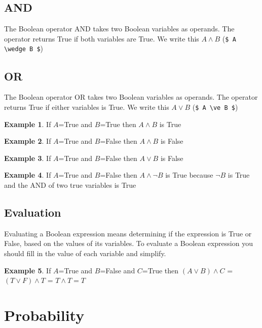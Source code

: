 \documentclass[]{article}
\theoremstyle{definition}
\newtheorem{exmp}{Example}[section]
\begin{document}
\subsection{AND}
The Boolean operator AND takes two Boolean variables as operands. The operator returns True if both variables are True. We write this $ A \wedge B$ (\verb|$ A \wedge B $|)

\subsection{OR}
The Boolean operator OR takes two Boolean variables as operands. The operator returns True if either variables is True. We write this $ A \vee B$ (\verb|$ A \ve B $|)

\begin{exmp}
If $A$=True and $B$=True then  $ A \wedge B$ is True
\end{exmp}

\begin{exmp}
If $A$=True and $B$=False then  $ A \wedge B$ is False
\end{exmp}

\begin{exmp}
If $A$=True and $B$=False then  $ A \vee B$ is False
\end{exmp}

\begin{exmp}
If $A$=True and $B$=False then  $ A \wedge \neg B$ is True because $\neg B$ is True and the AND of two true variables is True
\end{exmp}

\subsection{Evaluation}

Evaluating a Boolean expression means determining if the expression is True or False, based on the values of its variables. To evaluate a Boolean expression you should fill in the value of each variable and simplify.

\begin{exmp}
If $A$=True and $B$=False and $C$=True then  $ (A \vee B) \wedge C$ = $ (T \vee F) \wedge T$ = $ T \wedge T = T$  
\end{exmp}

\section{Probability}
\end{document}
